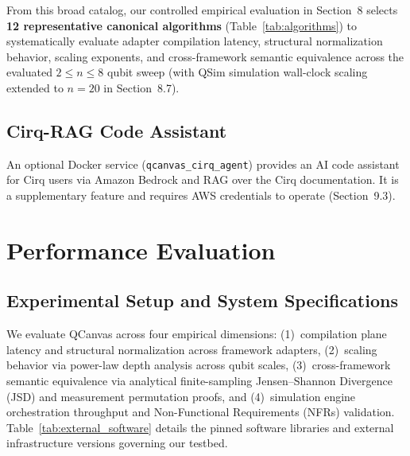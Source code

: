 \documentclass[runningheads]{llncs}
\begin{document}
From this broad catalog, our controlled empirical evaluation in Section~8 selects \textbf{12 representative canonical algorithms} (Table~\ref{tab:algorithms}) to systematically evaluate adapter compilation latency, structural normalization behavior, scaling exponents, and cross-framework semantic equivalence across the evaluated $2 \le n \le 8$ qubit sweep (with QSim simulation wall-clock scaling extended to $n=20$ in Section~8.7).

\subsection{Cirq-RAG Code Assistant}

An optional Docker service (\texttt{qcanvas\_cirq\_agent}) provides an AI code assistant for Cirq users via Amazon Bedrock and RAG over the Cirq documentation. It is a supplementary feature and requires AWS credentials to operate (Section~9.3).


\section{Performance Evaluation}

\subsection{Experimental Setup and System Specifications}

We evaluate QCanvas across four empirical dimensions: (1)~compilation plane latency and structural normalization across framework adapters, (2)~scaling behavior via power-law depth analysis across qubit scales, (3)~cross-framework semantic equivalence via analytical finite-sampling Jensen--Shannon Divergence (JSD) and measurement permutation proofs, and (4)~simulation engine orchestration throughput and Non-Functional Requirements (NFRs) validation. Table~\ref{tab:external_software} details the pinned software libraries and external infrastructure versions governing our testbed.
\end{document}
